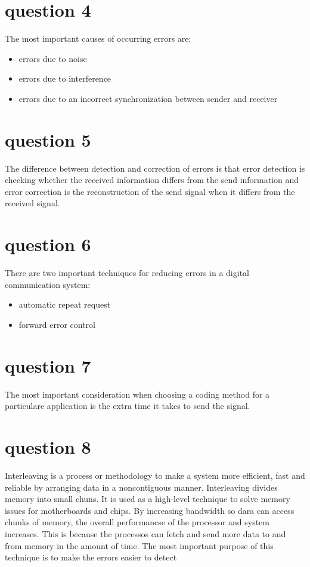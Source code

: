 \documentclass[final]{scrreprt} %
\begin{document}
\section{question 4}
The most important causes of occurring errors are:
\begin{itemize}
\item errors due to noise
\item errors due to interference
\item errors due to an incorrect synchronization between sender and receiver
\end{itemize}
\section{question 5}
The difference between detection and correction of errors is that error detection is checking whether the received information differs from the send information and error correction is the reconstruction of the send signal when it differs from the received signal. 
\section{question 6}
There are two important techniques for reducing errors in a digital communication system:
\begin{itemize}
\item automatic repeat request
\item forward error control
\end{itemize}
\section{question 7}
The most important consideration when choosing a coding method for a particulare application is the extra time it takes to send the signal.
\section{question 8}
Interleaving is a process or methodology to make a system more efficient, fast and reliable by arranging data in a noncontiguous manner.
Interleaving divides memory into small chuns. 
It is used as a high-level technique to solve memory issues for motherboards and chips.
By increasing bandwidth so dara can access chunks of memory, the overall performancse of the processor and system increases. 
This is because the processos can fetch and send more data to and from memory in the amount of time.
The most important purpose of this technique is to make the errors easier to detect 
\end{document}
